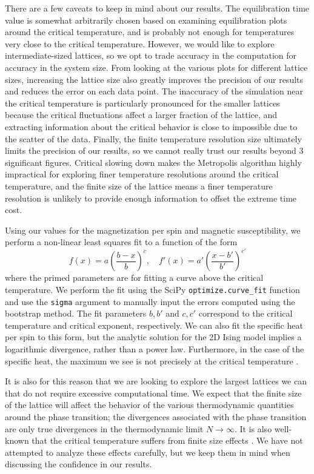 \documentclass[twocolumn,aps]{revtex4-1} %
\begin{document}
There are a few caveats to keep in mind about our results. The equilibration time value is somewhat arbitrarily chosen based on examining equilibration plots around the critical temperature, and is probably not enough for temperatures very close to the critical temperature. However, we would like to explore intermediate-sized lattices, so we opt to trade accuracy in the computation for accuracy in the system size. From looking at the various plots for different lattice sizes, increasing the lattice size also greatly improves the precision of our results and reduces the error on each data point. The inaccuracy of the simulation near the critical temperature is particularly pronounced for the smaller lattices because the critical fluctuations affect a larger fraction of the lattice, and extracting information about the critical behavior is close to impossible due to the scatter of the data. Finally, the finite temperature resolution size ultimately limits the precision of our results, so we cannot really trust our results beyond 3 significant figures. Critical slowing down makes the Metropolis algorithm highly impractical for exploring finer temperature resolutions around the critical temperature, and the finite size of the lattice means a finer temperature resolution is unlikely to provide enough information to offset the extreme time cost.

Using our values for the magnetization per spin and magnetic susceptibility, we perform a non-linear least squares fit to a function of the form
\begin{equation}
	f(x) = a\left(\frac{b-x}{b}\right)^c, \quad f'(x) = a'\left(\frac{x-b'}{b'}\right)^{c'}
\end{equation}
where the primed parameters are for fitting a curve above the critical temperature. We perform the fit using the SciPy \texttt{optimize.curve\_fit} function and use the \texttt{sigma} argument to manually input the errors computed using the bootstrap method. The fit parameters $b,b'$ and $c,c'$ correspond to the critical temperature and critical exponent, respectively. We can also fit the specific heat per spin to this form, but the analytic solution for the 2D Ising model implies a logarithmic divergence, rather than a power law. Furthermore, in the case of the specific heat, the maximum we see is not precisely at the critical temperature \cite{onsager}.

It is also for this reason that we are looking to explore the largest lattices we can that do not require excessive computational time. We expect that the finite size of the lattice will affect the behavior of the various thermodynamic quantities around the phase transition; the divergences associated with the phase transition are only true divergences in the thermodynamic limit $N \to \infty$. It is also well-known that the critical temperature suffers from finite size effects \cite{mcmethods, cardy, crittemp}. We have not attempted to analyze these effects carefully, but we keep them in mind when discussing the confidence in our results.
\end{document}

